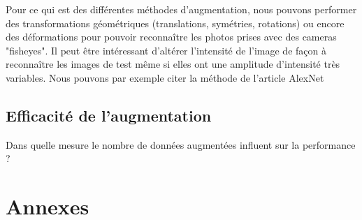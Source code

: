 \documentclass[a4paper,11pt]{article}
\begin{document}
	Pour ce qui est des différentes méthodes d'augmentation, nous pouvons performer des
	transformations géométriques (translations, symétries, rotations) ou encore des
	déformations pour pouvoir reconnaître les photos prises avec des cameras "fisheyes".
	Il peut être intéressant d'altérer l'intensité de l'image de façon à reconnaître les images
	de test même si elles ont une amplitude d'intensité très variables. Nous pouvons par exemple
	citer la méthode de l'article AlexNet \cite{einstein}


    \subsection{Efficacité de l'augmentation}

	Dans quelle mesure le nombre de données augmentées influent sur la performance ?

\section{Annexes}


\end{document}
